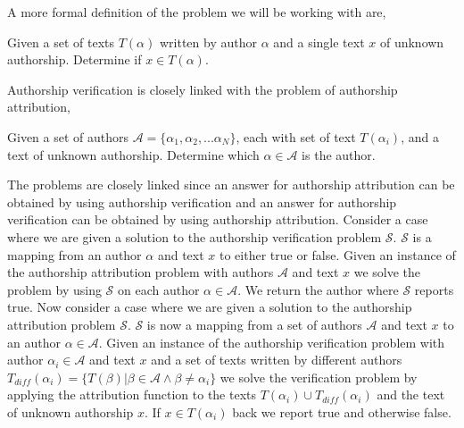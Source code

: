 
A more formal definition of the problem we will be working with are,

\begin{definition}

    Given a set of texts $T(\alpha)$ written by author $\alpha$ and a single
    text $x$ of unknown authorship. Determine if $x \in T(\alpha)$.

\end{definition}

Authorship verification is closely linked with the problem of authorship
attribution,

\begin{definition}

    Given a set of authors $\mathcal{A} = \{ \alpha_1, \alpha_2,...\alpha_N\}$,
    each with set of text $T(\alpha_i)$, and a text of unknown authorship.
    Determine which $\alpha \in \mathcal{A}$ is the author.

\end{definition}

The problems are closely linked since an answer for authorship attribution
can be obtained by using authorship verification and an answer for authorship
verification can be obtained by using authorship attribution. Consider a
case where we are given a solution to the authorship verification problem
$\mathcal{S}$. $\mathcal{S}$ is a mapping from an author $\alpha$ and text
$x$ to either true or false. Given an instance of the authorship attribution
problem with authors $\mathcal{A}$ and text $x$ we solve the problem by using
$\mathcal{S}$ on each author $\alpha \in \mathcal{A}$. We return the author
where $\mathcal{S}$ reports true. Now consider a case where we are given a
solution to the authorship attribution problem $\mathcal{S}$. $\mathcal{S}$ is
now a mapping from a set of authors $\mathcal{A}$ and text $x$ to an author
$\alpha \in \mathcal{A}$. Given an instance of the authorship verification
problem with author $\alpha_i \in \mathcal{A}$ and text $x$ and a set of
texts written by different authors $T_{diff}(\alpha_i) = \{T(\beta) | \beta
\in \mathcal{A} \land \beta \neq \alpha_i\}$ we solve the verification
problem by applying the attribution function to the texts $T(\alpha_i)
\cup T_{diff}(\alpha_i)$ and the text of unknown authorship $x$. If $x \in
T(\alpha_i)$ back we report true and otherwise false.
